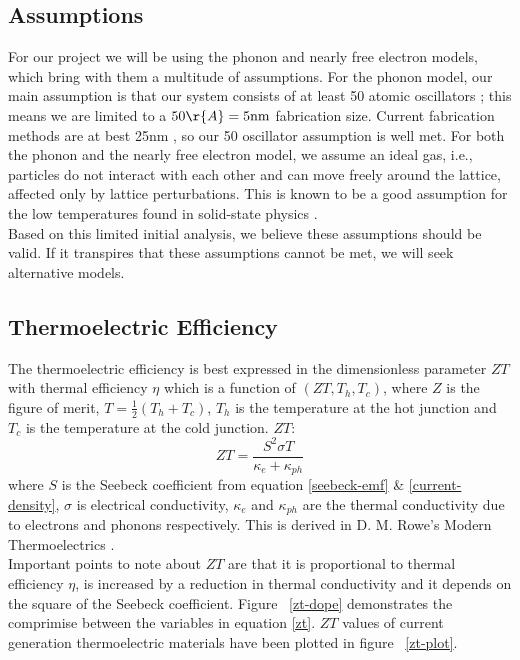 \documentclass[12pt,titlepage,draft]{article}
\newcommand{\figref}[2][\figurename~]{#1\ref{#2}}
\begin{document}
\subsection{Assumptions}
For our project we will be using the phonon and nearly free electron models, which
bring with them a multitude of assumptions. For the phonon model, our
main assumption is that our system consists of at least 50 atomic oscillators
\cite{kittel}; this means we are limited to a $50\r{A} = 5
\mathrm{nm}$ fabrication size. Current fabrication methods are at best
25nm \cite{minnich-review}, so our 50 oscillator assumption is well met.
For both the phonon and the nearly free electron model, we assume an ideal gas,
i.e., particles do not interact with each other and can move freely
around the lattice, affected only by lattice perturbations. This is
known to be a good assumption for the low temperatures found in solid-state physics
\cite{kittel}.\\
Based on this limited initial analysis, we believe these assumptions
should be valid. If it transpires that these assumptions cannot be met, we will seek alternative models.\\

\subsection{Thermoelectric Efficiency}
The thermoelectric efficiency is best expressed in the dimensionless
parameter $ZT$ with thermal efficiency $\eta$ which is a function of $(ZT, T_h,
T_c)$, where $Z$ is the figure of merit, $T = \frac{1}{2}(T_h +
T_c)$, $T_h$ is the temperature at the hot junction and $T_c$ is the
temperature at the cold junction. $ZT$:
\begin{equation}
\label{zt}
	ZT = \frac{S^2 \sigma T}{\kappa_e + \kappa_{ph}}
\end{equation}
where $S$ is the Seebeck coefficient from equation \eqref{seebeck-emf}
\& \eqref{current-density}, $\sigma$ is electrical conductivity,
$\kappa_e$ and $\kappa_{ph}$ are the thermal conductivity due to
electrons and phonons respectively. This is derived in D. M. Rowe's Modern
Thermoelectrics \cite{modern-thermoelectrics}.\\
Important points to note about $ZT$ are that it is proportional to thermal efficiency $\eta$, is increased by a reduction in thermal conductivity and it depends on the square of the Seebeck coefficient. Figure \figref{zt-dope} demonstrates the comprimise between the variables in equation \eqref{zt}. $ZT$ values of current generation thermoelectric materials have been plotted in figure \figref{zt-plot}.
\end{document}

